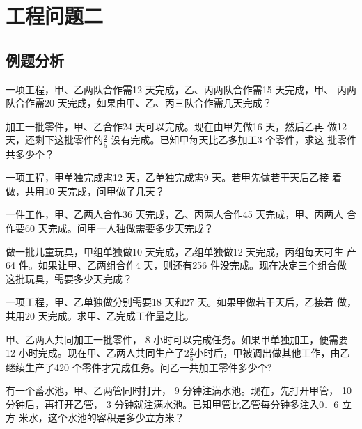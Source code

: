 \chapter{工程问题二}
\section{例题分析}
\begin{example}
    一项工程，甲、乙两队合作需12 天完成，乙、丙两队合作需15 天完成，甲、
丙两队合作需20 天完成，如果由甲、乙、丙三队合作需几天完成？
\end{example}
\vspace{2cm}
\begin{example}
    加工一批零件，甲、乙合作24 天可以完成。现在由甲先做16 天，然后乙再
    做12 天，还剩下这批零件的$\frac{2}{5}$ 没有完成。已知甲每天比乙多加工3 个零件，求这
    批零件共多少个？
\end{example}
\vspace{2cm}
\begin{example}
    一项工程，甲单独完成需12 天，乙单独完成需9 天。若甲先做若干天后乙接
着做，共用10 天完成，问甲做了几天？
\end{example}
\vspace{2cm}
\begin{example}
    一件工作，甲、乙两人合作36 天完成，乙、丙两人合作45 天完成，甲、丙两人
合作要60 天完成。问甲一人独做需要多少天完成？
\end{example}
\vfill
\begin{example}
    做一批儿童玩具，甲组单独做10 天完成，乙组单独做12 天完成，丙组每天可生
产64 件。如果让甲、乙两组合作4 天，则还有256 件没完成。现在决定三个组合做
这批玩具，需要多少天完成？
\end{example}
\vfill
\begin{example}
    一项工程，甲、乙单独做分别需要18 天和27 天。如果甲做若干天后，乙接着
做，共用20 天完成。求甲、乙完成工作量之比。
\end{example}
\newpage
\vspace{2cm}
\begin{example}
    甲、乙两人共同加工一批零件， 8 小时可以完成任务。如果甲单独加工，便需要
12 小时完成。现在甲、乙两人共同生产了2$\frac{2}{5}$小时后，甲被调出做其他工作，由乙
继续生产了420 个零件才完成任务。问乙一共加工零件多少个?
\end{example}
\vspace{2cm}
\begin{example}
    有一个蓄水池，甲、乙两管同时打开， 9 分钟注满水池。现在，先打开甲管， 10
分钟后，再打开乙管， 3 分钟就注满水池。已知甲管比乙管每分钟多注入0．6 立方
米水，这个水池的容积是多少立方米？
\end{example}
